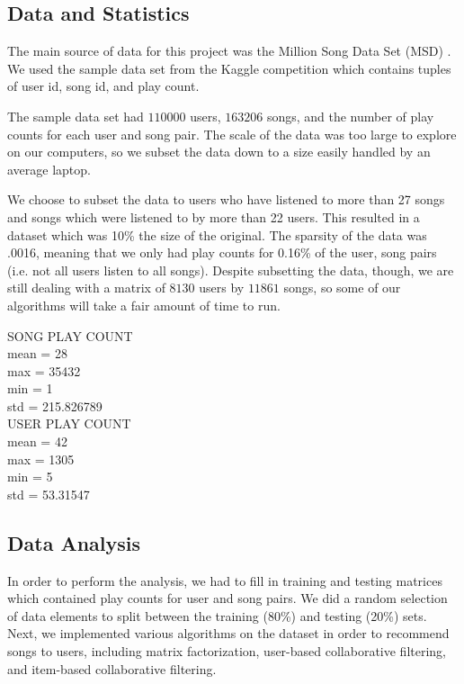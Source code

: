 \documentclass[12pt,preprint]{aastex}
\begin{document}
\subsection{Data and Statistics}
The main source of data for this project was the Million Song Data Set (MSD)  \citep{Bertin-Mahieux2011}. We used the sample data set from the Kaggle competition which contains tuples of user id, song id, and play count.  

The sample data set had $110000$ users, $163206$ songs, and the number of play counts for each user and song pair.
The scale of the data was too large to explore on our computers, so we subset the data down to a size easily handled by an average laptop. 

We choose to subset the data to users who have listened to more than 27 songs and songs which were listened to by more than 22 users. This resulted in a dataset which was 10\% the size of the original. The sparsity of the data was .0016, meaning that we only had play counts for 0.16\% of the user, song pairs (i.e. not all users listen to all songs). Despite subsetting the data, though, we are still dealing with a matrix of $8130$ users by $11861$ songs, so some of our algorithms will take a fair amount of time to run.


SONG PLAY COUNT  \\
mean = 28 \\
max = 35432 \\
min = 1 \\
std = 215.826789\\

USER PLAY COUNT\\
mean = 42\\
max = 1305\\
min = 5\\
std = 53.31547\\


\subsection{Data Analysis}
In order to perform the analysis, we had to fill in training and testing matrices which contained play counts for user and song pairs. We did a random selection of data elements to split between the training (80\%) and testing (20\%) sets. Next, we implemented various algorithms on the dataset in order to recommend songs to users, including matrix factorization, user-based collaborative filtering, and item-based collaborative filtering.
\end{document}
